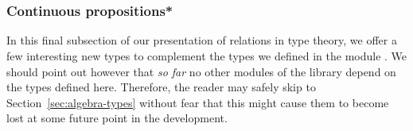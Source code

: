 \begin{code}%
\>[0][@{}l@{\AgdaIndent{0}}]%
\>[1]\AgdaSpace{}%
\AgdaSymbol{:}\AgdaSpace{}%
\>[402I]\AgdaSpace{}%
\AgdaSpace{}%
\AgdaSpace{}%
\AgdaSpace{}%
\AgdaSpace{}%
\AgdaSpace{}%
\AgdaSpace{}%
\AgdaSpace{}%
\AgdaSymbol{(}\AgdaSpace{}%
\AgdaSymbol{))}\AgdaSpace{}%
\AgdaSpace{}%
\AgdaSpace{}%
\AgdaSpace{}%
\AgdaSpace{}%
\<%
\\
\>[1][@{}l@{\AgdaIndent{0}}]%
\>[2]%
%
\>[25]\AgdaSpace{}%
\AgdaSpace{}%
\AgdaSpace{}%
\AgdaSpace{}%
\AgdaFunction{,}\AgdaSpace{}%
\AgdaSpace{}%
\AgdaSpace{}%
\AgdaSpace{}%
\AgdaSpace{}%
\AgdaFunction{,}\AgdaSpace{}%
\AgdaSymbol{(}\AgdaSpace{}%
\AgdaSpace{}%
\AgdaSpace{}%
\AgdaSpace{}%
\AgdaSpace{}%
\AgdaSpace{}%
\AgdaSpace{}%
\AgdaSpace{}%
\AgdaSpace{}%
\AgdaSpace{}%
\AgdaSpace{}%
\AgdaSpace{}%
\AgdaSymbol{)}\<%
\\
%
\>[1]\AgdaSpace{}%
\AgdaSpace{}%
\AgdaSpace{}%
\AgdaSpace{}%
\AgdaSpace{}%
\AgdaSpace{}%
\AgdaSpace{}%
\AgdaSymbol{=}\AgdaSpace{}%
\AgdaSpace{}%
\AgdaSpace{}%
\AgdaSpace{}%
\AgdaSpace{}%
\<%
\end{code}







\subsubsection{Continuous propositions*}\label{sec:cont-prop-types}
In this final subsection of our presentation of relations in type theory, we offer a few interesting new types to complement the types we defined in the module .  We should point out however that \emph{so far} no other modules of the library depend on the types defined here. Therefore, the reader may safely skip to Section~\ref{sec:algebra-types} without fear that this might cause them to become lost at some future point in the development.


